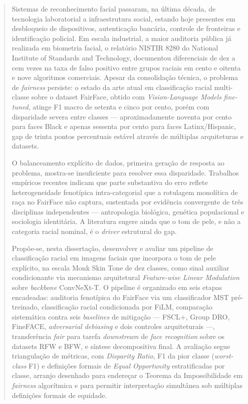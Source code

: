 \begin{abstract}
\noindent Sistemas de reconhecimento facial passaram, na última década, de tecnologia laboratorial a infraestrutura social, estando hoje presentes em desbloqueio de dispositivos, autenticação bancária, controle de fronteiras e identificação policial. Em escala industrial, a maior auditoria pública já realizada em biometria facial, o relatório NISTIR 8280 do National Institute of Standards and Technology, documentou diferenciais de dez a cem vezes na taxa de falso positivo entre grupos raciais em cento e oitenta e nove algoritmos comerciais. Apesar da consolidação técnica, o problema de \emph{fairness} persiste: o estado da arte atual em classificação racial multi-classe sobre o dataset FairFace, obtido com \emph{Vision-Language Models} \emph{fine-tuned}, atinge F1 macro de setenta e cinco por cento, porém com disparidade severa entre classes --- aproximadamente noventa por cento para faces Black e apenas sessenta por cento para faces Latinx/Hispanic, gap de trinta pontos percentuais estável através de múltiplas arquiteturas e datasets.

\noindent O balanceamento explícito de dados, primeira geração de resposta ao problema, mostra-se insuficiente para resolver essa disparidade. Trabalhos empíricos recentes indicam que parte substantiva do erro reflete heterogeneidade fenotípica intra-categorial que a rotulagem monolítica de raça no FairFace não captura, sustentada por evidência convergente de três disciplinas independentes --- antropologia biológica, genética populacional e sociologia identitária. A literatura sugere ainda que o tom de pele, e não a categoria racial nominal, é o \emph{driver} estrutural do gap.

\noindent Propõe-se, nesta dissertação, desenvolver e avaliar um pipeline de classificação racial em imagens faciais que incorpora o tom de pele explícito, na escala Monk Skin Tone de dez classes, como sinal auxiliar condicionante via mecanismo arquitetural \emph{Feature-wise Linear Modulation} sobre \emph{backbone} ConvNeXt-T. O pipeline é organizado em seis etapas encadeadas: auditoria fenotípica do FairFace via um classificador MST pré-treinado, classificação racial condicionada por FiLM, comparação sistemática contra seis \emph{baselines} de mitigação --- FSCL+, Group DRO, FineFACE, \emph{adversarial debiasing} e dois controles arquiteturais ---, transferência \emph{fair} para tarefa \emph{downstream} de \emph{face recognition} sobre os datasets RFW e BFW, e síntese decompositiva final. A avaliação segue triangulação de métricas, com \emph{Disparity Ratio}, F1 da pior classe (\emph{worst-class} F1) e definições formais de \emph{Equal Opportunity} estratificadas por classe, arranjo desenhado para endereçar o Teorema da Impossibilidade em \emph{fairness} algorítmica e para permitir interpretação simultânea sob múltiplas definições formais de equidade.


\end{abstract}
